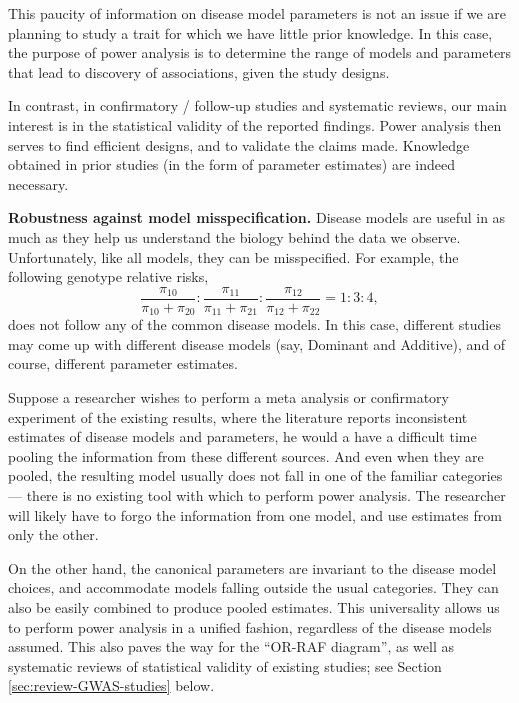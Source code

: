 This paucity of information on disease model parameters is not an issue if we are planning to study a trait for which we have little prior knowledge.
In this case, the purpose of power analysis is to determine the range of models and parameters that lead to discovery of associations, given the study designs.

In contrast, in confirmatory / follow-up studies and systematic reviews, our main interest is in the statistical validity of the reported findings.
Power analysis then serves to find efficient designs, and to validate the claims made.
Knowledge obtained in prior studies (in the form of parameter estimates) are indeed necessary.

\medskip\noindent
{\bf Robustness against model misspecification.}
Disease models are useful in as much as they help us understand the biology behind the data we observe.
Unfortunately, like all models, they can be misspecified. 
For example, the following genotype relative risks,
\begin{equation*}
    \frac{\pi_{10}}{\pi_{10} + \pi_{20}} : \frac{\pi_{11}}{\pi_{11} + \pi_{21}} : \frac{\pi_{12}}{\pi_{12} + \pi_{22}}
    = 1 : 3 : 4,
\end{equation*}
does not follow any of the common disease models.
In this case, different studies may come up with different disease models (say, Dominant and Additive), and of course, different parameter estimates.

Suppose a researcher wishes to perform a meta analysis or confirmatory experiment of the existing results, where the literature reports inconsistent estimates of disease models and parameters,
he would a have a difficult time pooling the information from these different sources. 
And even when they are pooled, the resulting model usually does not fall in one of the familiar categories --- there is no existing tool with which to perform power analysis.
The researcher will likely have to forgo the information from one model, and use estimates from only the other.

On the other hand, the canonical parameters are invariant to the disease model choices, and accommodate models falling outside the usual categories. 
They can also be easily combined to produce pooled estimates.
This universality allows us to perform power analysis in a unified fashion, regardless of the disease models assumed.
This also paves the way for the ``OR-RAF diagram'', as well as systematic reviews of statistical validity of existing studies; see Section \ref{sec:review-GWAS-studies} below.

